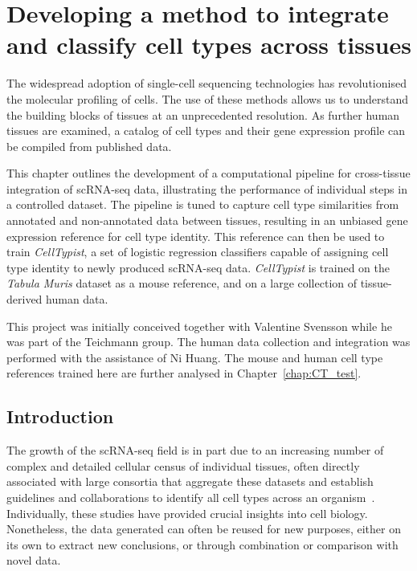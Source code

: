 \chapter{Developing a method to integrate and classify cell types across tissues} \label{chap:CT_method}

\ifpdf
    \graphicspath{{Chapter3/Figs/Raster/}{Chapter3/Figs/PDF/}{Chapter3/Figs/}}
\else
    \graphicspath{{Chapter3/Figs/Vector/}{Chapter3/Figs/}}
\fi
The widespread adoption of single-cell sequencing technologies has revolutionised the molecular profiling of cells. The use of these methods allows us to understand the building blocks of tissues at an unprecedented resolution. As further human tissues are examined, a catalog of cell types and their gene expression profile can be compiled from published data. 

This chapter outlines the development of a computational pipeline for cross-tissue integration of scRNA-seq data, illustrating the performance of individual steps in a controlled dataset. The pipeline is tuned to capture cell type similarities from annotated and non-annotated data between tissues, resulting in an unbiased gene expression reference for cell type identity. This reference can then be used to train \textit{CellTypist}, a set of logistic regression classifiers capable of assigning cell type identity to newly produced scRNA-seq data. \textit{CellTypist} is trained on the \textit{Tabula Muris} dataset as a mouse reference, and on a large collection of tissue-derived human data.

This project was initially conceived together with Valentine Svensson while he was part of the Teichmann group. The human data collection and integration was performed with the assistance of Ni Huang. The mouse and human cell type references trained here are further analysed in Chapter~\ref{chap:CT_test}.


\section{Introduction}
\label{section3.1}
The growth of the scRNA-seq field is in part due to an increasing number of complex and detailed cellular census of individual tissues, often directly associated with large consortia that aggregate these datasets and establish guidelines and collaborations to identify all cell types across an organism~\citep{regev_human_2017}. Individually, these studies have provided crucial insights into cell biology. Nonetheless, the data generated can often be reused for new purposes, either on its own to extract new conclusions, or through combination or comparison with novel data. 

